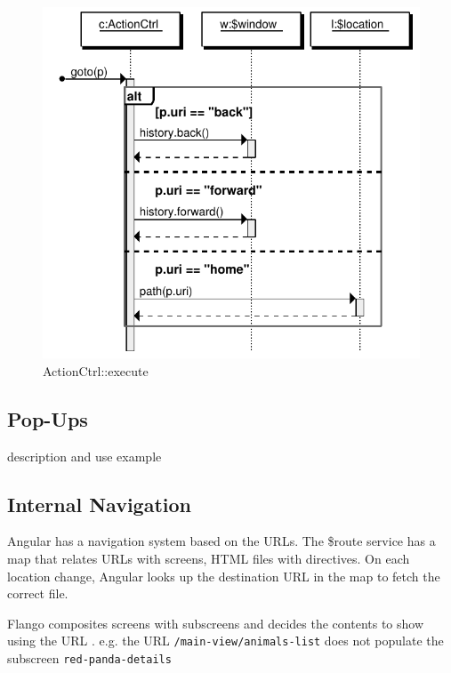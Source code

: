 \begin{figure}[htb]
    \centering
    \includegraphics{figures/design/seqdia/actionCtrl-goto.pdf}
    \caption{ActionCtrl::execute}
    \label{fig:design-seqdia-actionCtrl-goto}
\end{figure}

\FloatBarrier

\subsection{Pop-Ups}
description and use example

\subsection{Internal Navigation}
Angular has a navigation system based on the \acp{URL}.
The \$route service has a map that relates \acp{URL} with screens, \ac{HTML} files with directives.
On each location change, Angular looks up the destination \ac{URL} in the map to fetch the correct file.

Flango \cm composites screens with subscreens and decides the contents to show using the \ac{URL} .
e.g. the \ac{URL} \texttt{/main-view/animals-list} does not populate the subscreen \texttt{red-panda-details}

